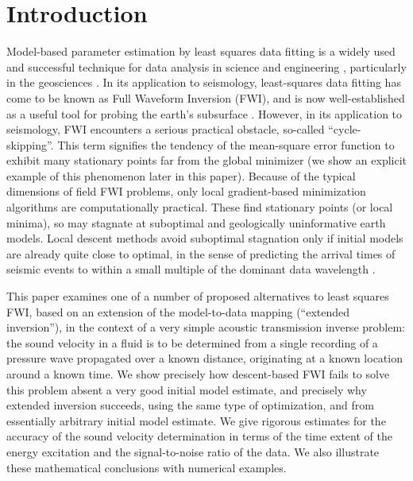 \section{Introduction}
Model-based parameter estimation by least squares data fitting is a
widely used and successful technique for data analysis in science and
engineering \cite[]{Bertero:98,Vogel:02}, particularly in the
geosciences \cite[]{Parker:94,Tarantola:05}. In its application to
seismology, least-squares data fitting has come to be known as Full
Waveform Inversion (FWI), and is now well-established as a useful tool
for probing the earth's subsurface
\cite[]{VirieuxOperto:09,Fichtner:10,Schuster:17}. However, in its
application to seismology, FWI encounters a serious
practical obstacle, so-called ``cycle-skipping''. This term signifies
the tendency of the mean-square error function to exhibit many
stationary points far from the global minimizer (we
show an explicit example of this phenomenon later in this paper). Because of the
typical dimensions of field FWI problems, only local gradient-based
minimization algorithms are computationally practical. These find
stationary points (or local minima), so may stagnate at suboptimal and geologically
uninformative earth models. Local descent methods avoid suboptimal
stagnation only if initial models are already quite close to optimal,
in the sense of predicting the arrival times of seismic events to
within a small multiple of the dominant data wavelength
\cite[]{GauTarVir:86,VirieuxOperto:09,Plessix:10}.

This paper examines one of a number of proposed alternatives to least
squares FWI, based on an extension of the model-to-data mapping
(``extended inversion''), in the context of 
a very simple acoustic transmission inverse problem: the sound
velocity in a fluid is to be determined from a single recording of a
pressure wave propagated over a known distance, originating at a known
location around a known time. We show precisely
how descent-based FWI fails to solve this problem absent a very good
initial model estimate, and precisely why extended inversion succeeds, using the same type
of optimization, and from essentially arbitrary initial model
estimate. We give rigorous estimates for the accuracy of the sound
velocity determination in terms of the time extent of the energy
excitation and the signal-to-noise ratio of the data. We also illustrate
these mathematical conclusions with numerical
examples.

